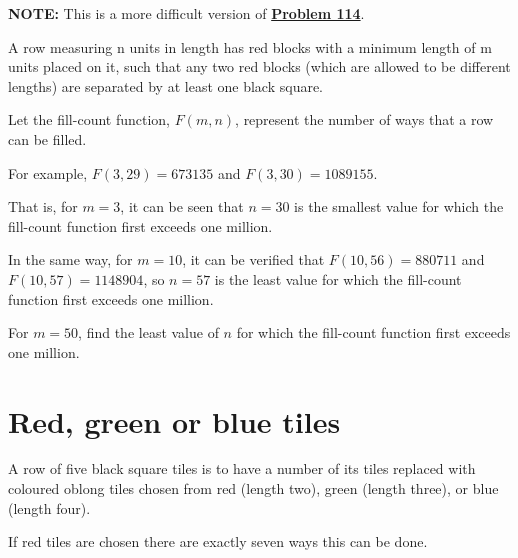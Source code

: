 \textbf{NOTE:} This is a more difficult version of \hyperref[pb.0114]{\textbf{Problem 114}}.

A row measuring n units in length has red blocks with a minimum length of m units placed on it, such that any two red blocks (which are allowed to be different lengths) are separated by at least one black square.

Let the fill-count function, $F(m, n)$, represent the number of ways that a row can be filled.

For example, $F(3, 29) = 673135$ and $F(3, 30) = 1089155$.

That is, for $m = 3$, it can be seen that $n = 30$ is the smallest value for which the fill-count function first exceeds one million.

In the same way, for $m = 10$, it can be verified that $F(10, 56) = 880711$ and $F(10, 57) = 1148904$, so $n = 57$ is the least value for which the fill-count function first exceeds one million.

For $m = 50$, find the least value of $n$ for which the fill-count function first exceeds one million.


\section{Red, green or blue tiles} \label{pb.0116}

A row of five black square tiles is to have a number of its tiles replaced with coloured oblong tiles chosen from red (length two), green (length three), or blue (length four).

If red tiles are chosen there are exactly seven ways this can be done.

